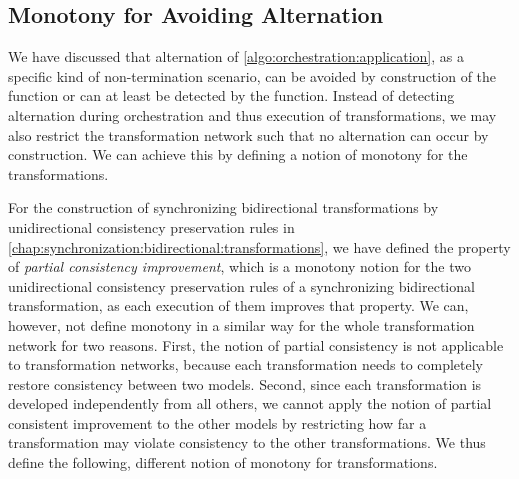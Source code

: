 \subsection{Monotony for Avoiding Alternation}

We have discussed that alternation of \autoref{algo:orchestration:application}, as a specific kind of non-termination scenario, can be avoided by construction of the  function or can at least be detected by the  function.
Instead of detecting alternation during orchestration and thus execution of transformations, we may also restrict the transformation network such that no alternation can occur by construction.
We can achieve this by defining a notion of monotony for the transformations.

For the construction of synchronizing bidirectional transformations by unidirectional consistency preservation rules in \autoref{chap:synchronization:bidirectional:transformations}, we have defined the property of \emph{partial consistency improvement}, which is a monotony notion for the two unidirectional consistency preservation rules of a synchronizing bidirectional transformation, as each execution of them improves that property.
We can, however, not define monotony in a similar way for the whole transformation network for two reasons.
First, the notion of partial consistency is not applicable to transformation networks, because each transformation needs to completely restore consistency between two models.
Second, since each transformation is developed independently from all others, we cannot apply the notion of partial consistent improvement to the other models by restricting how far a transformation may violate consistency to the other transformations.
%
We thus define the following, different notion of monotony for transformations.

